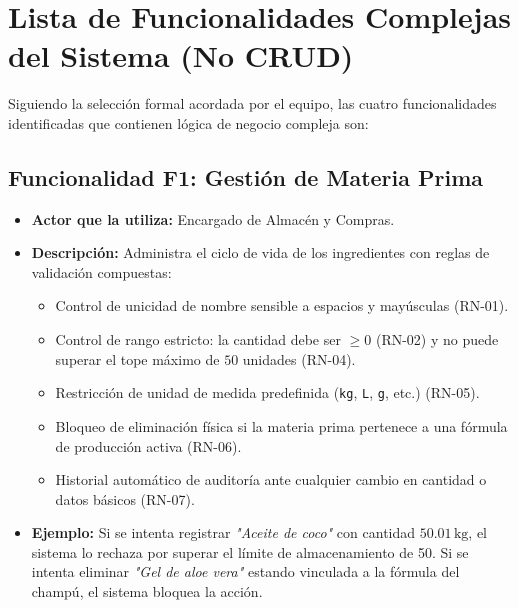 \documentclass[11pt,a4paper]{article}
\begin{document}
\section{Lista de Funcionalidades Complejas del Sistema (No CRUD)}

Siguiendo la selección formal acordada por el equipo, las cuatro funcionalidades identificadas que contienen lógica de negocio compleja son:

\subsection{Funcionalidad F1: Gestión de Materia Prima}
\begin{itemize}
    \item \textbf{Actor que la utiliza:} Encargado de Almacén y Compras.
    \item \textbf{Descripción:} Administra el ciclo de vida de los ingredientes con reglas de validación compuestas:
    \begin{itemize}
        \item Control de unicidad de nombre sensible a espacios y mayúsculas (RN-01).
        \item Control de rango estricto: la cantidad debe ser $\ge 0$ (RN-02) y no puede superar el tope máximo de $50$ unidades (RN-04).
        \item Restricción de unidad de medida predefinida (\texttt{kg}, \texttt{L}, \texttt{g}, etc.) (RN-05).
        \item Bloqueo de eliminación física si la materia prima pertenece a una fórmula de producción activa (RN-06).
        \item Historial automático de auditoría ante cualquier cambio en cantidad o datos básicos (RN-07).
    \end{itemize}
    \item \textbf{Ejemplo:} Si se intenta registrar \textit{"Aceite de coco"} con cantidad $50.01\,\text{kg}$, el sistema lo rechaza por superar el límite de almacenamiento de 50. Si se intenta eliminar \textit{"Gel de aloe vera"} estando vinculada a la fórmula del champú, el sistema bloquea la acción.
\end{itemize}
\end{document}
